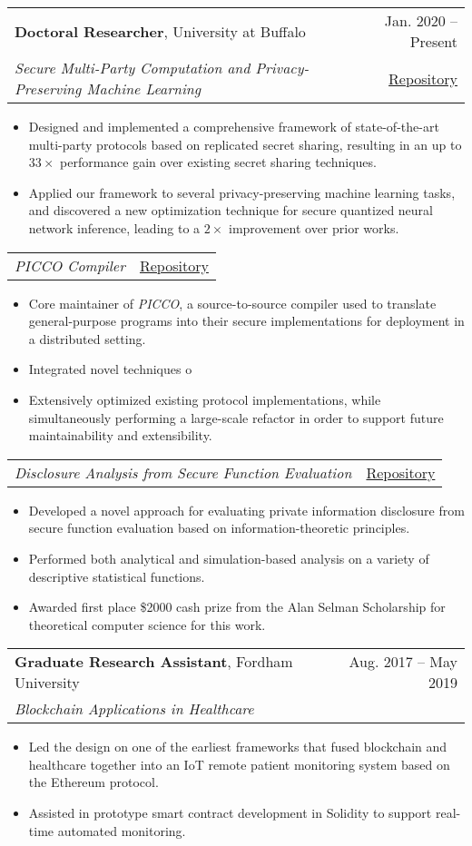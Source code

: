 \documentclass[letterpaper,11pt]{article}
\makeatletter
\newcommand{\resumeItem}[1]{
    \item\small{
        {#1 \vspace{-2pt}}
    }
}
\newcommand{\resumeSubheadingDesc}[6]{
    \vspace{-2pt}\item
    \begin{tabular*}{0.97\textwidth}[t]{l@{\extracolsep{\fill}}r}
        \textbf{#1}, #2 & #3 \\
        \textit{\small#4} {\small#5} & {\small #6} 
    \end{tabular*}\vspace{-7pt}
}
\newcommand{\resumeSubSubheading}[2]{
    \item
    \begin{tabular*}{0.97\textwidth}{l@{\extracolsep{\fill}}r}
        \textit{\small#1} & {\small #2} \\
    \end{tabular*}\vspace{-7pt}
}
\newcommand{\resumeItemListStart}{\begin{itemize}[leftmargin=0.20in]}
\newcommand{\resumeItemListEnd}{\end{itemize}\vspace{-5pt}}
\makeatother
\begin{document}
\resumeSubheadingDesc
{Doctoral Researcher}{University at Buffalo}{Jan. 2020 -- Present}
{Secure Multi-Party Computation and Privacy-Preserving Machine Learning}{}{
    \href{https://github.com/anbaccar/RSS_ring_ppml}{{Repository}}
}
\resumeItemListStart
\resumeItem{Designed and implemented a comprehensive framework of state-of-the-art multi-party protocols based on replicated secret sharing, resulting in an up to $33 \times $ performance gain over existing secret sharing techniques.}
\resumeItem{Applied our framework to several privacy-preserving machine learning tasks, and discovered a new optimization technique for secure quantized neural network inference, leading to a $2\times$ improvement over prior works.}
\resumeItemListEnd
\resumeSubSubheading
{PICCO Compiler}{
    \href{https://github.com/applied-crypto-lab/picco}{{Repository}}
}
\resumeItemListStart
\resumeItem{Core maintainer of \emph{PICCO}, a source-to-source compiler used to translate general-purpose programs into their secure implementations for deployment in a distributed setting.}
\resumeItem{Integrated novel techniques o}
\resumeItem{Extensively optimized existing protocol implementations, while simultaneously performing a large-scale refactor in order to support future maintainability and extensibility.}
\resumeItemListEnd
\resumeSubSubheading
{Disclosure Analysis from Secure Function Evaluation}{
\href{https://github.com/anbaccar/estimators}{{Repository}}
}
\resumeItemListStart
\resumeItem{Developed a novel approach for evaluating private information disclosure from secure function evaluation based on information-theoretic principles.}
\resumeItem{Performed both analytical and simulation-based analysis on a variety of descriptive statistical functions.}
\resumeItem{Awarded first place \$2000 cash prize from the Alan Selman Scholarship for theoretical computer science for this work.}
\resumeItemListEnd

\resumeSubheadingDesc
{Graduate Research Assistant}{Fordham University}{Aug. 2017 -- May 2019}
{Blockchain Applications in Healthcare}{}{}
\resumeItemListStart
\resumeItem{Led the design on one of the earliest frameworks that fused blockchain and healthcare together into an IoT remote patient monitoring system based on the Ethereum protocol.}
\resumeItem{Assisted in prototype smart contract development in Solidity to support real-time automated monitoring.}
\resumeItemListEnd
\end{document}
